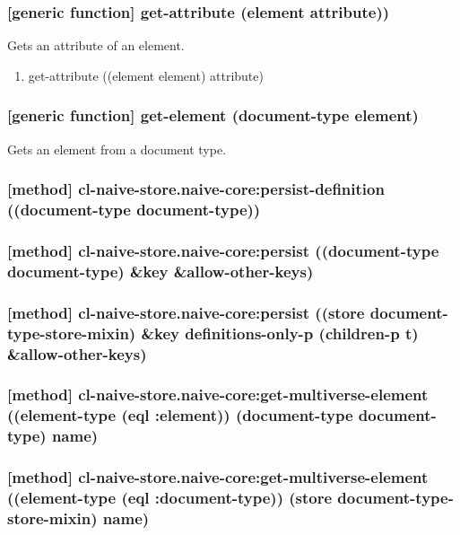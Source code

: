 \documentclass[11pt]{article}
\begin{document}
\subsubsection{[generic function] get-attribute (element attribute))}
\label{sec:orgbd5bfdf}

Gets an attribute of an element.

\begin{enumerate}
\item get-attribute ((element element) attribute)
\label{sec:org9411a05}
\end{enumerate}

\subsubsection{[generic function] get-element (document-type element)}
\label{sec:org4c4b013}

Gets an element from a document type.

\subsubsection{[method] cl-naive-store.naive-core:persist-definition ((document-type document-type))}
\label{sec:org6a57193}

\subsubsection{[method] cl-naive-store.naive-core:persist ((document-type document-type) \&key \&allow-other-keys)}
\label{sec:org5eaa272}

\subsubsection{[method] cl-naive-store.naive-core:persist ((store document-type-store-mixin) \&key definitions-only-p (children-p t) \&allow-other-keys)}
\label{sec:org141eb71}

\subsubsection{[method] cl-naive-store.naive-core:get-multiverse-element ((element-type (eql :element)) (document-type document-type) name)}
\label{sec:org0853e44}

\subsubsection{[method] cl-naive-store.naive-core:get-multiverse-element ((element-type (eql :document-type)) (store document-type-store-mixin) name)}
\label{sec:orgf2df136}
\end{document}
